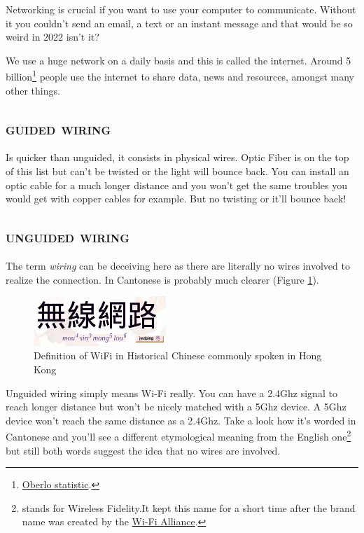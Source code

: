 \documentclass[a4paper,12pt]{book}
\begin{document}


\newline \noindent Networking is crucial if you want to use your computer to communicate. Without it you couldn’t send an email, a text or an instant message and that would be so weird in 2022 isn't it?

\noindent We use a huge network on a daily basis and this is called the internet. Around 5 billion\footnote{\label{peopleOnInternet}\href{https://www.oberlo.com/statistics/how-many-people-use-internet}{Oberlo statistic}.} people use the internet to share data, news and resources, amongst many other things.
\clearpage
\subsection{\textsc{guided wiring}}
Is quicker than unguided, it consists in physical wires. Optic Fiber is on the top of this list but can't be twisted or the light will bounce back. You can install an optic cable for a much longer distance and you won't get the same troubles you would get with copper cables for example. But no twisting or it'll bounce back!

\subsection{\textsc{unguided wiring}}
The term \emph{wiring} can be deceiving here as there are literally no wires involved to realize the connection. In Cantonese is probably much clearer (Figure \ref{fig:wifihk}).


\begin{figure}
\centering
\includegraphics[width=5cm]{WiFi-HK.PNG}
\caption{Definition of WiFi in Historical Chinese commonly spoken in Hong Kong}\label{fig:wifihk}
\end{figure}


Unguided wiring simply means Wi-Fi really. You can have a 2.4Ghz signal to reach longer distance but won't be nicely matched with a 5Ghz device. A 5Ghz device won't reach the same distance as a 2.4Ghz. Take a look how it's worded in Cantonese and you'll see a different etymological meaning from the English one\footnote{\label{wifialliance}stands for Wireless Fidelity.It kept this name for a short time after the brand name was created by the \href{https://en.wikipedia.org/wiki/Wi-Fi_Alliance}{Wi-Fi Alliance}.} but still both words suggest the idea that no wires are involved.
\end{document}
